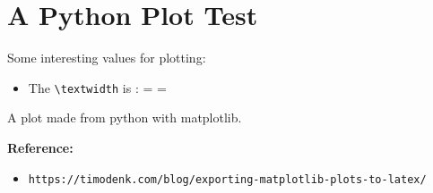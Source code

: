 \documentclass[12pt,a4paper]{article}
\begin{document}
\thispagestyle{empty}
 \section{A Python Plot Test}
 
 Some interesting values for plotting:
 \begin{itemize}
 	\item The \verb!\textwidth! is : \the\textwidth = \prntlen{\textwidth} = \prntlen{\textwidth}
 \end{itemize}

\begin{Figure}[htb]
\begin{center}

\end{center}
	\caption{A plot made from python with matplotlib.}
	\label{fig:first}
\end{Figure}

\textbf{Reference:}
\begin{itemize}
	\item[] \verb!https://timodenk.com/blog/exporting-matplotlib-plots-to-latex/! 
\end{itemize}
\end{document}
